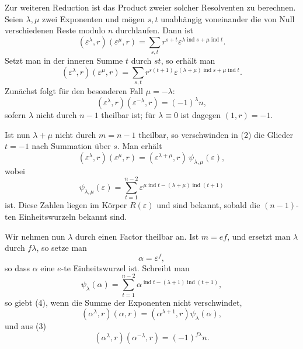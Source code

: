 \documentclass[11pt]{article}
\providecommand{\ind}{\operatorname{ind}}
\begin{document}
Zur weiteren Reduction ist das Product zweier solcher Resolventen zu berechnen. Seien $\lambda,\mu$ zwei Exponenten und mögen $s,t$ unabhängig voneinander die von Null verschiedenen Reste modulo $n$ durchlaufen. Dann ist
\[
 (\varepsilon^\lambda,r)(\varepsilon^\mu,r)=
 \sum_{s,t} r^{s+t}\varepsilon^{\lambda\ind s+\mu\ind t}.
\]
Setzt man in der inneren Summe $t$ durch $st$, so erhält man
\[
 (\varepsilon^\lambda,r)(\varepsilon^\mu,r)=
 \sum_{s,t} r^{s(t+1)}
 \varepsilon^{(\lambda+\mu)\ind s+\mu\ind t}.                         \tag{2}
\]
Zunächst folgt für den besonderen Fall $\mu=-\lambda$:
\[
        (\varepsilon^\lambda,r)(\varepsilon^{-\lambda},r)=(-1)^\lambda n,       \tag{3}
\]
sofern $\lambda$ nicht durch $n-1$ theilbar ist; für $\lambda\equiv0$ ist dagegen $(1,r)=-1$.

Ist nun $\lambda+\mu$ nicht durch $m=n-1$ theilbar, so verschwinden in (2) die Glieder $t=-1$ nach Summation über $s$. Man erhält
\[
        (\varepsilon^\lambda,r)(\varepsilon^\mu,r)=
        (\varepsilon^{\lambda+
\mu},r)\,\psi_{\lambda,\mu}(\varepsilon),              \tag{4}
\]
wobei
\[
        \psi_{\lambda,\mu}(\varepsilon)=
        \sum_{t=1}^{n-2}
        \varepsilon^{\mu\ind t-(\lambda+
\mu)\ind(t+1)}                         \tag{5}
\]
ist. Diese Zahlen liegen im Körper $R(\varepsilon)$ und sind bekannt, sobald die $(n-1)$-ten Einheitswurzeln bekannt sind.

Wir nehmen nun $\lambda$ durch einen Factor theilbar an. Ist $m=ef$, und ersetzt man $\lambda$ durch $f\lambda$, so setze man
\[
        \alpha=\varepsilon^f,                                                    \tag{6}
\]
so dass $\alpha$ eine $e$-te Einheitswurzel ist. Schreibt man
\[
        \psi_\lambda(\alpha)=
        \sum_{t=1}^{n-2}\alpha^{\ind t-(\lambda+1)\ind(t+1)},                  \tag{7}
\]
so giebt (4), wenn die Summe der Exponenten nicht verschwindet,
\[
        (\alpha^\lambda,r)(\alpha,r)=
        (\alpha^{\lambda+1},r)\psi_\lambda(\alpha),                             \tag{8}
\]
und aus (3)
\[
        (\alpha^\lambda,r)(\alpha^{-\lambda},r)=(-1)^{f\lambda}n.               \tag{9}
\]
\end{document}
